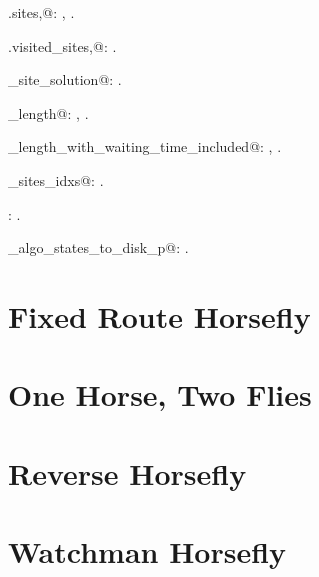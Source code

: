 \documentclass[11.5pt]{report}
\begin{document}
{\begin{list}{}{\setlength{\itemsep}{-\parsep}\setlength{\itemindent}{-\leftmargin}}
\item \verb@self.sites,@: , \underline{}.
\item \verb@self.visited_sites,@: \underline{}.
\item \verb@single_site_solution@: \underline{}.
\item \verb@tour_length@: , \underline{}.
\item \verb@tour_length_with_waiting_time_included@: , \underline{}.
\item \verb@unmarked_sites_idxs@: \underline{}.
\item \verb@wrapperkeyPressHandler@: \underline{}.
\item \verb@write_algo_states_to_disk_p@: \underline{}.
\end{list}} 


\label{chap:segment-horsefly}\chapter{Fixed Route Horsefly}
\label{chap:fixed-route-horsefly}\chapter{One Horse, Two Flies}
\label{chap:one-horse-two-flies}
\chapter{Reverse Horsefly}
\label{chap:reverse-horsefly}\chapter{Watchman Horsefly}
\label{watchman-horsefly}
\end{document}
